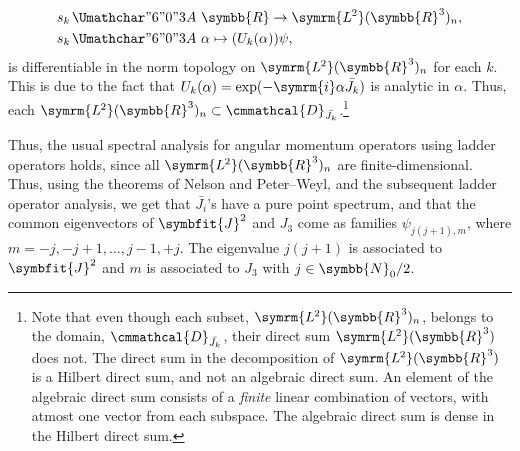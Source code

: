 \documentclass[12pt, a4 paper]{article}
\renewcommand{\symcal}{\cmmathcal}
\theoremstyle{definition}
\newcommand{\ltwo}{\symrm{L\kern-0.3pt^2}}
\newcommand{\ltworthree}{\ltwo(\rr^3)}
\newcommand{\rr}{\symbb{R}}
\renewcommand{\i}{\symrm{i}}
\newcommand{\domain}{\symcal{D}}
\renewcommand{\colon}{\nobreak\mskip2mu\mathpunct{}\nonscript
  \mkern-\thinmuskip{\Umathchar"6 "0 "3A}\mskip6muplus1mu\relax}
\begin{document}
    \begin{align*}
        s_k &\colon \rr \rightarrow \ltworthree_n,\\
        s_k &\colon \alpha \mapsto (U_k(\alpha))\psi,
    \end{align*}
    is differentiable in the norm topology on \(\ltworthree_n\) for each \(k\). This is due to the fact that \(U_k(\alpha) = \exp(-\i \alpha \bar{J_k})\) is analytic in \(\alpha\). Thus, each \(\ltworthree_n \subset \domain_{\bar{J_k}}\).\footnote{Note that even though each subset, \(\ltworthree_n\), belongs to the domain, \(\domain_{\bar{J_k}}\), their direct sum \(\ltworthree\) does not. The direct sum in the decomposition of \(\ltworthree\) is a Hilbert direct sum, and not an algebraic direct sum. An element of the algebraic direct sum consists of a \textit{finite} linear combination of vectors, with atmost one vector from each subspace. The algebraic direct sum is dense in the Hilbert direct sum.}

    Thus, the usual spectral analysis for angular momentum operators using ladder operators holds, since all \(\ltworthree_n\) are finite-dimensional. Thus, using the theorems of Nelson and Peter--Weyl, and the subsequent ladder operator analysis, we get that $\bar{J_i}$'s have a pure point spectrum, and that the common eigenvectors of $\symbfit{J}^2$ and $J_3$ come as families $\psi_{j(j+1), m}$, where $m = -j, -j+1, \dots, j-1, +j$. The eigenvalue $j(j+1)$ is associated to $\symbfit{J}^2$ and $m$ is associated to $J_3$ with $j \in \symbb{N}_0/2$.
\end{document}
